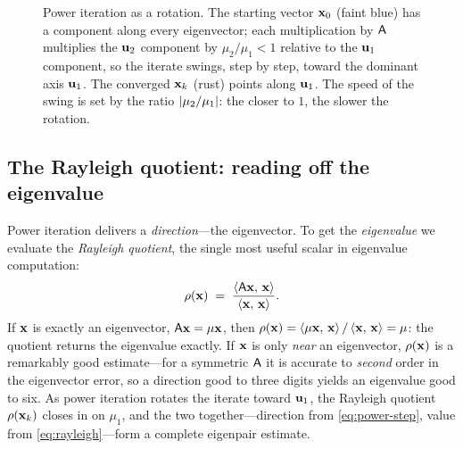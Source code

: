 \begin{figure}[t]
\centering
{}
\caption[Power iteration rotates toward the dominant eigenvector]{Power
iteration as a rotation. The starting vector $\mathbf{x}_0$ (faint blue) has a component
along every eigenvector; each multiplication by $\mathsf{A}$ multiplies the
$\mathbf{u}_2$ component by $\mu_2/\mu_1<1$ relative to the $\mathbf{u}_1$ component, so the
iterate swings, step by step, toward the dominant axis $\mathbf{u}_1$. The converged
$\mathbf{x}_k$ (rust) points along $\mathbf{u}_1$. The speed of the swing is set by the ratio
$\lvert\mu_2/\mu_1\rvert$: the closer to $1$, the slower the rotation.}
\label{fig:power-rotate}
\end{figure}

\subsection{The Rayleigh quotient: reading off the eigenvalue}

Power iteration delivers a \emph{direction}---the eigenvector. To get the
\emph{eigenvalue} we evaluate the \emph{Rayleigh quotient}, the single most
useful scalar in eigenvalue computation:
\begin{equation}
  \rho(\mathbf{x}) \;=\; \frac{\left\langle \mathsf{A}\mathbf{x},\, \mathbf{x}\right\rangle}{\left\langle \mathbf{x},\, \mathbf{x}\right\rangle}.
  \label{eq:rayleigh}
\end{equation}
If $\mathbf{x}$ is exactly an eigenvector, $\mathsf{A}\mathbf{x}=\mu\mathbf{x}$, then
$\rho(\mathbf{x})=\left\langle \mu\mathbf{x},\, \mathbf{x}\right\rangle/\left\langle \mathbf{x},\, \mathbf{x}\right\rangle=\mu$: the quotient returns the
eigenvalue exactly. If $\mathbf{x}$ is only \emph{near} an eigenvector, $\rho(\mathbf{x})$ is a
remarkably good estimate---for a symmetric $\mathsf{A}$ it is accurate to
\emph{second} order in the eigenvector error, so a direction good to three digits
yields an eigenvalue good to six. As power iteration rotates the iterate toward
$\mathbf{u}_1$, the Rayleigh quotient $\rho(\mathbf{x}_k)$ closes in on $\mu_1$, and the two
together---direction from \cref{eq:power-step}, value from
\cref{eq:rayleigh}---form a complete eigenpair estimate.

